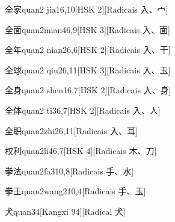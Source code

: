 \begin{entry}{全家}{quan2 jia1}{6,10}[HSK 2][Radicais ⼊、⼧]
\end{entry}

\begin{entry}{全面}{quan2mian4}{6,9}[HSK 3][Radicais ⼊、⾯]
\end{entry}

\begin{entry}{全年}{quan2 nian2}{6,6}[HSK 2][Radicais ⼊、⼲]
\end{entry}

\begin{entry}{全球}{quan2 qiu2}{6,11}[HSK 3][Radicais ⼊、⽟]
\end{entry}

\begin{entry}{全身}{quan2 shen1}{6,7}[HSK 2][Radicais ⼊、⾝]
\end{entry}

\begin{entry}{全体}{quan2 ti3}{6,7}[HSK 2][Radicais ⼊、⼈]
\end{entry}

\begin{entry}{全职}{quan2zhi2}{6,11}[Radicais ⼊、⽿]
\end{entry}

\begin{entry}{权利}{quan2li4}{6,7}[HSK 4][Radicais ⽊、⼑]
\end{entry}

\begin{entry}{拳法}{quan2fa3}{10,8}[Radicais ⼿、⽔]
\end{entry}

\begin{entry}{拳王}{quan2wang2}{10,4}[Radicais ⼿、⽟]
\end{entry}

\begin{entry}{犬}{quan3}{4}[Kangxi 94][Radical ⽝]
\end{entry}

